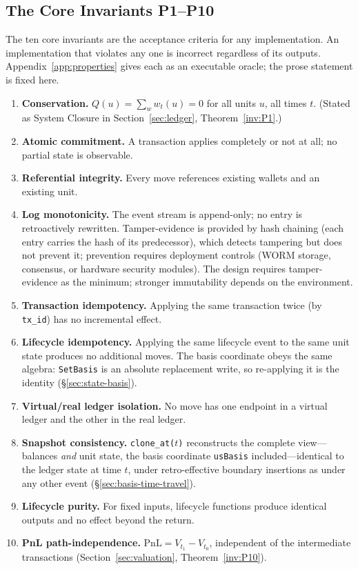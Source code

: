 \documentclass[11pt,a4paper]{article}
\begin{document}
\subsection{The Core Invariants P1--P10}
\label{sec:invariants-core}

The ten core invariants are the acceptance criteria for any implementation. An implementation that violates any one is incorrect regardless of its outputs. Appendix~\ref{app:properties} gives each as an executable oracle; the prose statement is fixed here.

\begin{enumerate}
\item[\textbf{P1}] \textbf{Conservation.} $Q(u)=\sum_w w_t(u)=0$ for all units $u$, all times $t$. (Stated as System Closure in Section~\ref{sec:ledger}, Theorem~\ref{inv:P1}.)
\item[\textbf{P2}] \textbf{Atomic commitment.}\label{inv:P2} A transaction applies completely or not at all; no partial state is observable.
\item[\textbf{P3}] \textbf{Referential integrity.}\label{inv:P3} Every move references existing wallets and an existing unit.
\item[\textbf{P4}] \textbf{Log monotonicity.}\label{inv:P4} The event stream is append-only; no entry is retroactively rewritten. Tamper-evidence is provided by hash chaining (each entry carries the hash of its predecessor), which detects tampering but does not prevent it; prevention requires deployment controls (WORM storage, consensus, or hardware security modules). The design requires tamper-evidence as the minimum; stronger immutability depends on the environment.
\item[\textbf{P5}] \textbf{Transaction idempotency.}\label{inv:P5} Applying the same transaction twice (by \texttt{tx\_id}) has no incremental effect.
\item[\textbf{P6}] \textbf{Lifecycle idempotency.}\label{inv:P6} Applying the same lifecycle event to the same unit state produces no additional moves. The basis coordinate obeys the same algebra: \texttt{SetBasis} is an absolute replacement write, so re-applying it is the identity (\S\ref{sec:state-basis}).
\item[\textbf{P7}] \textbf{Virtual/real ledger isolation.}\label{inv:P7} No move has one endpoint in a virtual ledger and the other in the real ledger.
\item[\textbf{P8}] \textbf{Snapshot consistency.}\label{inv:P8} \texttt{clone\_at($t$)} reconstructs the complete view---balances \emph{and} unit state, the basis coordinate \texttt{usBasis} included---identical to the ledger state at time $t$, under retro-effective boundary insertions as under any other event (\S\ref{sec:basis-time-travel}).
\item[\textbf{P9}] \textbf{Lifecycle purity.}\label{inv:P9} For fixed inputs, lifecycle functions produce identical outputs and no effect beyond the return.
\item[\textbf{P10}] \textbf{PnL path-independence.} $\mathrm{PnL}=V_{t_1}-V_{t_0}$, independent of the intermediate transactions (Section~\ref{sec:valuation}, Theorem~\ref{inv:P10}).
\end{enumerate}
\end{document}
